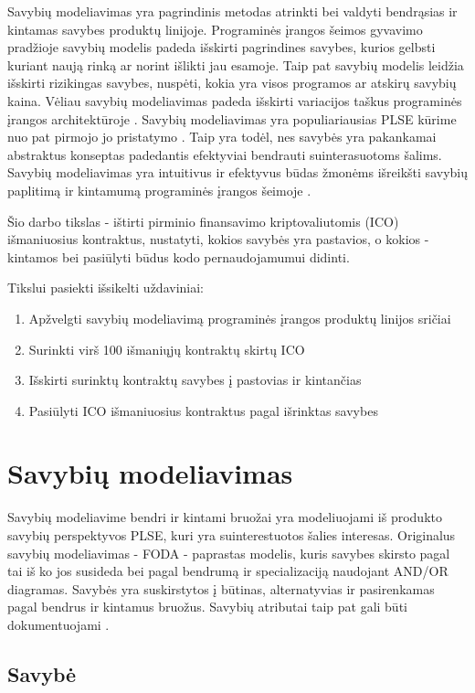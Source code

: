 \documentclass{VUMIFPSkursinis}
\begin{document}
Savybių modeliavimas yra pagrindinis metodas atrinkti bei valdyti bendrąsias ir kintamas savybes produktų linijoje. Programinės įrangos šeimos gyvavimo pradžioje savybių modelis padeda išskirti pagrindines savybes, kurios gelbsti kuriant naują rinką ar  norint išlikti jau esamoje. Taip pat savybių modelis leidžia išskirti rizikingas savybes, nuspėti, kokia yra visos programos ar atskirų savybių kaina. Vėliau savybių modeliavimas padeda išskirti variacijos taškus programinės įrangos architektūroje \cite{Czarnecki2004}. Savybių modeliavimas yra populiariausias PLSE kūrime nuo pat pirmojo jo pristatymo \cite{Kang1990}. Taip yra todėl, nes savybės yra pakankamai abstraktus konseptas padedantis efektyviai bendrauti suinterasuotoms šalims. Savybių modeliavimas yra intuitivus ir efektyvus būdas žmonėms išreikšti savybių paplitimą ir kintamumą programinės įrangos šeimoje \cite{Kang2013}. 

Šio darbo tikslas - ištirti pirminio finansavimo kriptovaliutomis (ICO) išmaniuosius kontraktus, nustatyti, kokios savybės yra pastavios, o kokios - kintamos bei pasiūlyti būdus kodo pernaudojamumui didinti. 

Tikslui pasiekti išsikelti uždaviniai:
\begin{enumerate}
\item Apžvelgti savybių modeliavimą programinės įrangos produktų linijos sričiai 
\item Surinkti virš 100 išmaniųjų kontraktų skirtų ICO
\item Išskirti surinktų kontraktų savybes į pastovias ir kintančias
\item Pasiūlyti ICO išmaniuosius kontraktus pagal išrinktas savybes
\end{enumerate}

\section{Savybių modeliavimas}
Savybių modeliavime bendri ir kintami bruožai yra modeliuojami iš produkto savybių perspektyvos PLSE, kuri yra suinterestuotos šalies interesas. Originalus savybių modeliavimas - FODA \cite{Kang1990} - paprastas modelis, kuris savybes skirsto pagal tai iš ko jos susideda bei pagal bendrumą ir specializaciją naudojant AND/OR  diagramas. Savybės yra suskirstytos į būtinas, alternatyvias ir pasirenkamas pagal bendrus ir kintamus bruožus. Savybių atributai taip pat gali būti dokumentuojami \cite{Kang2013}.

\subsection{Savybė}
\end{document}
